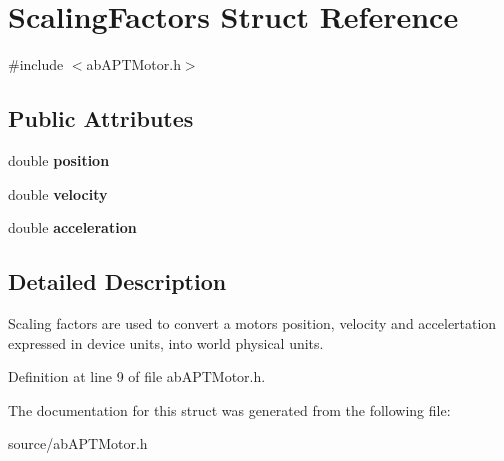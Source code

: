 \hypertarget{struct_scaling_factors}{}\section{Scaling\+Factors Struct Reference}
\label{struct_scaling_factors}


{\ttfamily \#include $<$ab\+A\+P\+T\+Motor.\+h$>$}

\subsection*{Public Attributes}
\begin{DoxyCompactItemize}
\item 
double {\bfseries position}\hypertarget{struct_scaling_factors_ad44893e5393c09251d1988ce6a710a21}{}\label{struct_scaling_factors_ad44893e5393c09251d1988ce6a710a21}

\item 
double {\bfseries velocity}\hypertarget{struct_scaling_factors_ac036c7d85dc520a41e56e9275a261d12}{}\label{struct_scaling_factors_ac036c7d85dc520a41e56e9275a261d12}

\item 
double {\bfseries acceleration}\hypertarget{struct_scaling_factors_a54b1f17a7fba729deba581e36db6cb64}{}\label{struct_scaling_factors_a54b1f17a7fba729deba581e36db6cb64}

\end{DoxyCompactItemize}


\subsection{Detailed Description}
Scaling factors are used to convert a motors position, velocity and accelertation expressed in device units, into world physical units. 

Definition at line 9 of file ab\+A\+P\+T\+Motor.\+h.



The documentation for this struct was generated from the following file\+:\begin{DoxyCompactItemize}
\item 
source/ab\+A\+P\+T\+Motor.\+h\end{DoxyCompactItemize}
